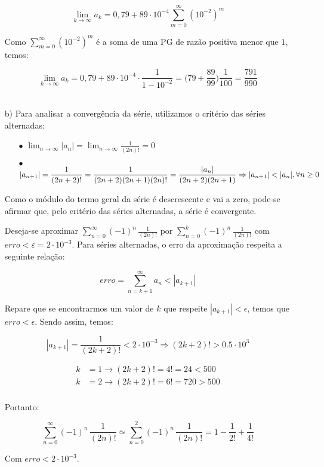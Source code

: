 \documentclass[12pt,a4paper]{article}
\begin{document}
\begin{itemize}
    $$ \lim_{k \rightarrow \infty} a_k = 0,79 + 89 \cdot 10^{-4} \sum_{m=0}^{\infty} (10^{-2})^m $$
    
    Como $\displaystyle\sum_{m=0}^{\infty} (10^{-2})^m$ é a soma de uma PG de razão positiva menor que $1$, temos:
    
    $$ \lim_{k \rightarrow \infty} a_k = 0,79 + 89 \cdot 10^{-4} \cdot \frac{1}{1 - 10^{-2}} = \Big(79 + \frac{89}{99} \Big) \frac{1}{100} = \frac{791}{990} $$ \\



    \item[b)] Para analisar a convergência da série, utilizamos o critério das séries alternadas:
    
    \begin{itemize}
    \item[$\bullet$] $\displaystyle\lim_{n \rightarrow \infty} |a_n| = \lim_{n \rightarrow \infty} \displaystyle\frac{1}{(2n)!} = 0 $
    \item[$\bullet$] $|a_{n+1}| = \displaystyle\frac{1}{(2n+2)!} = \displaystyle\frac{1}{(2n+2)(2n+1)(2n)!} = \frac{|a_n|}{(2n+2)(2n+1)} \\ \Rightarrow |a_{n+1}| < |a_n|, \forall n \geq 0  $
    \end{itemize}
    
    Como o módulo do termo geral da série é descrescente e vai a zero, pode-se afirmar que, pelo critério das séries alternadas, a série é convergente.
    
    Deseja-se aproximar $\displaystyle\sum_{n=0}^\infty (-1)^n \, \frac{1}{(2n)!}$ por $\displaystyle\sum_{n=0}^k (-1)^n \, \frac{1}{(2n)!}$  com $erro < \varepsilon = 2\cdot 10^{-3}$.
Para séries alternadas, o erro da aproximação respeita a seguinte relação:

$$ erro = \sum_{n=k+1}^\infty a_n < |a_{k+1}| $$

Repare que se encontrarmos um valor de $k$ que respeite $|a_{k+1}| < \epsilon$, temos que $erro < \epsilon$. Sendo assim, temos:

$$|a_{k+1}| = \frac{1}{(2k+2)!} < 2\cdot 10^{-3} \Rightarrow (2k+2)! > 0.5 \cdot 10^{3} $$

\begin{align*} 
    k &= 1 \rightarrow (2k+2)! = 4! = 24 < 500 \\ 
    k &= 2 \rightarrow (2k+2)! = 6! = 720 > 500 \\
\end{align*}

Portanto: 

$$ \sum_{n=0}^\infty (-1)^n \, \frac{1}{(2n)!}  \simeq \sum_{n=0}^2 (-1)^n \, \frac{1}{(2n)!} = 1 - \frac{1}{2!} + \frac{1}{4!} $$

Com $erro < 2 \cdot 10^{-3}$.
    

\end{itemize}
\ \
\end{document}

